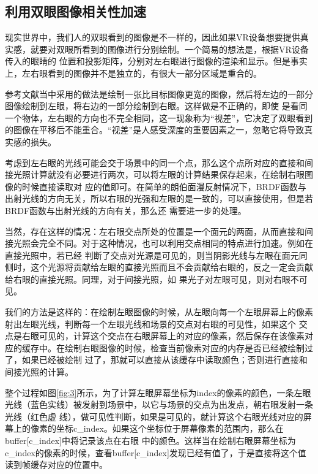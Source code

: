 \documentclass[UTF8]{ctexart}
\begin{document}
    \subsection{利用双眼图像相关性加速}
        现实世界中，我们人的双眼看到的图像是不一样的，因此如果VR设备想要提供真实感，就要对双眼所看到的图像进行分别绘制。一个简易的想法是，根据VR设备传入的眼睛的
        位置和投影矩阵，分别对左右眼进行图像的渲染和显示。但是事实上，左右眼看到的图像并不是独立的，有很大一部分区域是重合的。
        
        参考文献\cite{fujita2014foveated}当中采用的做法是绘制一张比目标图像更宽的图像，然后将左边的一部分图像绘制到左眼，将右边的一部分绘制到右眼。这样做是不正确的，即使
        是看同一个物体，左右眼的方向也不完全相同，这一现象称为“视差”，它决定了双眼看到的图像在平移后不能重合。“视差”是人感受深度的重要因素之一，忽略它将导致真实感的损失。
        
        考虑到左右眼的光线可能会交于场景中的同一个点，那么这个点所对应的直接和间接光照计算就没有必要进行两次，可以将左眼的计算结果保存起来，在绘制右眼图像的时候直接读取对
        应的值即可。在简单的朗伯面漫反射情况下，BRDF函数与出射光线的方向无关，所以右眼的光强和左眼的是一致的，可以直接使用，但是若BRDF函数与出射光线的方向有关，那么还
        需要进一步的处理。

        当然，存在这样的情况：左右眼交点所处的位置是一个面元的两面，从而直接和间接光照会完全不同。对于这种情况，也可以利用交点相同的特点进行加速。例如在直接光照中，若已经
        判断了交点对光源是可见的，则当阴影光线与左眼在面元同侧时，这个光源将贡献给左眼的直接光照而且不会贡献给右眼的，反之一定会贡献给右眼的直接光照。同理，对于间接光照，如
        果光子对左眼可见，则对右眼不可见。
        
        我们的方法是这样的：在绘制左眼图像的时候，从左眼向每一个左眼屏幕上的像素射出左眼光线，判断每一个左眼光线和场景的交点对右眼的可见性，如果这个
        交点是右眼可见的，计算这个交点在右眼屏幕上的对应的像素，然后保存在该像素对应的缓存中。在绘制右眼图像的时候，检查当前像素对应的内存是否已经被绘制过了，如果已经被绘制
        过了，那就可以直接从该缓存中读取颜色；否则进行直接和间接光照的计算。
        
        整个过程如图\ref{fig:3}所示，为了计算左眼屏幕坐标为index的像素的颜色，一条左眼光线（蓝色实线）被发射到场景中，以它与场景的交点为出发点，朝右眼发射一条光线（红色虚
        线），做可见性判断，如果是可见的，就计算这个右眼光线对应的屏幕上的像素的坐标c\_index。如果这个坐标位于屏幕像素的范围内，那么在buffer[c\_index]中将记录该点在右眼
        中的颜色。这样当在绘制右眼屏幕坐标为c\_index的像素的时候，查看buffer[c\_index]发现已经有值了，于是直接将这个值读到帧缓存对应的位置中。
        
\end{document}
